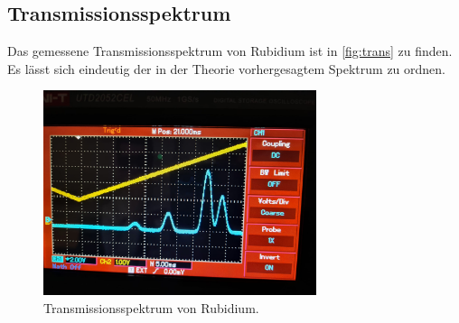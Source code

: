\subsection{Transmissionsspektrum}
\label{sec:trans}
Das gemessene Transmissionsspektrum von Rubidium ist in \autoref{fig:trans} zu finden. Es lässt sich eindeutig
der in der Theorie vorhergesagtem Spektrum zu ordnen.
\begin{figure}
    \centering
    \includegraphics[height=6cm]{content/pics/5.jpg}
    \caption{Transmissionsspektrum von Rubidium.}
    \label{fig:trans}
\end{figure}